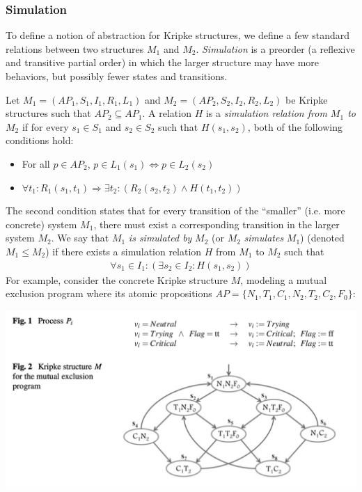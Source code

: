 \documentclass[10pt,a4paper]{article}
\begin{document}
\subsubsection*{Simulation}
To define a notion of abstraction for Kripke structures, we define a few standard relations between two structures $M_1$ and $M_2$. \textit{Simulation} is a preorder (a reflexive and transitive partial order) in which the larger structure may have more behaviors, but possibly fewer states and transitions.

Let $M_1=(AP_1,S_1,I_1,R_1,L_1)$ and $M_2=(AP_2,S_2,I_2,R_2,L_2)$ be Kripke structures such that $AP_2 \subseteq AP_1$. A relation $H$ is a \textit{simulation relation from $M_1$ to $M_2$} if for every $s_1 \in S_1$ and $s_2 \in S_2$ such that $H(s_1,s_2)$, both of the following conditions hold:
\begin{itemize}
    \item For all $p \in AP_2$, $p \in L_1(s_1) \iff p \in L_2(s_2)$
    \item $\forall t_1 :  R_1(s_1,t_1) \Rightarrow \exists t_2 : (R_2(s_2,t_2) \wedge H(t_1,t_2))$
\end{itemize}
The second condition states that for every transition of the ``smaller'' (i.e. more concrete) system $M_1$, there must exist a corresponding transition in the larger system $M_2$. We say that $M_1$ \textit{is simulated by} $M_2$ (or $M_2$ \textit{simulates} $M_1$) (denoted $M_1 \leq M_2$) if there exists a simulation relation $H$ from $M_1$ to $M_2$ such that 
\begin{align*}
    \forall s_1 \in I_1 : (\exists s_2 \in I_2 : H(s_1,s_2))
\end{align*}
For example, consider the concrete Kripke structure $M$, modeling a mutual exclusion program where its atomic propositions $AP=\{N_1,T_1,C_1,N_2,T_2,C_2,F_0\}$:
\begin{center}
    \includegraphics[scale=0.35]{images/concrete-mutex.png}
\end{center}
\end{document}
